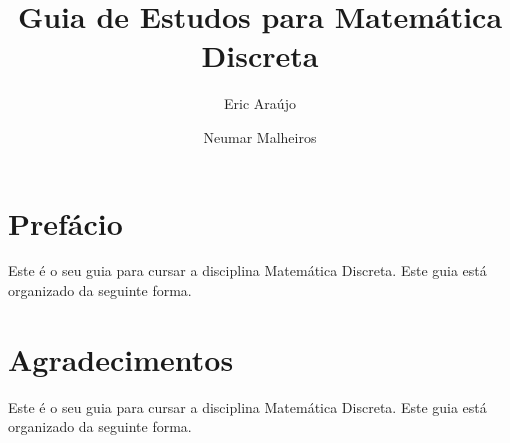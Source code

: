 \documentclass[12pt,a4paper,oneside]{book}
\begin{document}
\pagestyle{empty}
\title{Guia de Estudos para Matem\'atica Discreta}
\author{Eric Ara\'ujo \and Neumar Malheiros}
\maketitle


\pagestyle{fancy}
\fancyhf{}
\lhead[]{\thepage}
\rhead[\thepage]{}


\chapter*{Pref\'acio}

Este \'e o seu guia para cursar a disciplina Matem\'atica Discreta. Este guia est\'a organizado da seguinte forma.

\chapter*{Agradecimentos}

Este \'e o seu guia para cursar a disciplina Matem\'atica Discreta. Este guia est\'a organizado da seguinte forma.

\newpage
\renewcommand{\cftchapdotsep}{\cftdotsep}
\tableofcontents

% 















\end{document}
